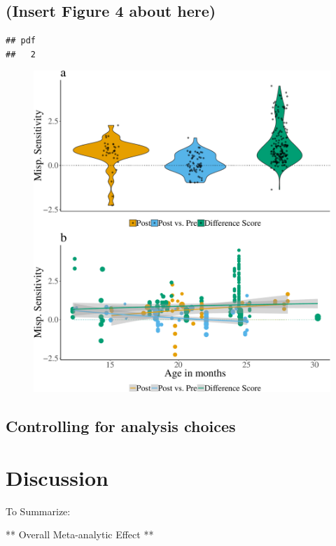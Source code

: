 \documentclass[man]{apa6}
\theoremstyle{definition}
\theoremstyle{definition}
\theoremstyle{definition}
\theoremstyle{remark}
\begin{document}
\subsection{(Insert Figure 4 about
here)}\label{insert-figure-4-about-here}

\begin{verbatim}
## pdf 
##   2
\end{verbatim}

\begin{figure}
\centering
\includegraphics{Paper_Analyses_files/figure-latex/Plot_Within_cond_age_diff_score-1.pdf}
\caption{}
\end{figure}

\subsection{Controlling for analysis
choices}\label{controlling-for-analysis-choices}

\section{Discussion}\label{discussion}

To Summarize:

** Overall Meta-analytic Effect **
\end{document}
